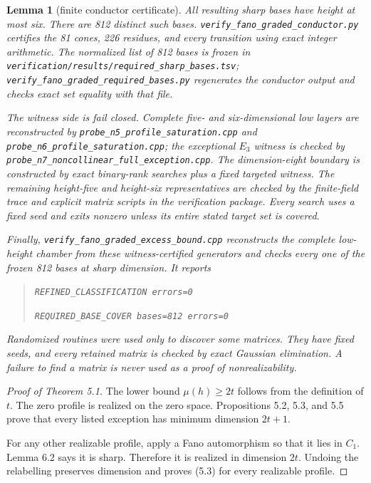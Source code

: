 \documentclass[11pt]{article}
\newtheorem{lemma}[theorem]{Lemma}
\theoremstyle{remark}
\numberwithin{equation}{section}
\begin{document}
\begin{lemma}[finite conductor certificate]
All resulting sharp bases have height at most six. There are 812 distinct such
bases. \nolinkurl{verify_fano_graded_conductor.py} certifies the 81 cones, 226 residues,
and every transition using exact integer arithmetic. The normalized list of 812
bases is frozen in \nolinkurl{verification/results/required_sharp_bases.tsv};
\nolinkurl{verify_fano_graded_required_bases.py} regenerates the conductor output and
checks exact set equality with that file.

The witness side is fail closed. Complete five- and six-dimensional low layers
are reconstructed by \nolinkurl{probe_n5_profile_saturation.cpp} and
\nolinkurl{probe_n6_profile_saturation.cpp}; the exceptional $E_3$ witness is checked by
\nolinkurl{probe_n7_noncollinear_full_exception.cpp}. The dimension-eight boundary is
constructed by exact binary-rank searches plus a fixed targeted witness. The
remaining height-five and height-six representatives are checked by the
finite-field trace and explicit matrix scripts in the verification package.
Every search uses a fixed seed and exits nonzero unless its entire stated target
set is covered.

Finally, \nolinkurl{verify_fano_graded_excess_bound.cpp} reconstructs the complete
low-height chamber from these witness-certified generators and checks every one
of the frozen 812 bases at sharp dimension. It reports

\begin{quote}\small\raggedright
\texttt{REFINED\_\allowbreak{}CLASSIFICATION errors=0}\par
\texttt{REQUIRED\_\allowbreak{}BASE\_\allowbreak{}COVER bases=812 errors=0}\par
\end{quote}


Randomized routines were used only to discover some matrices. They have fixed
seeds, and every retained matrix is checked by exact Gaussian elimination. A
failure to find a matrix is never used as a proof of nonrealizability.

\end{lemma}

\begin{proof}[Proof of Theorem 5.1]

The lower bound $\mu(h)\ge2t$ follows from the definition of $t$. The zero
profile is realized on the zero space. Propositions 5.2, 5.3, and 5.5 prove that
every listed exception has minimum dimension $2t+1$.

For any other realizable profile, apply a Fano automorphism so that it lies in
$C_1$. Lemma 6.2 says it is sharp. Therefore it is realized in dimension $2t$.
Undoing the relabelling preserves dimension and proves (5.3) for every
realizable profile.
\end{proof}
\end{document}
